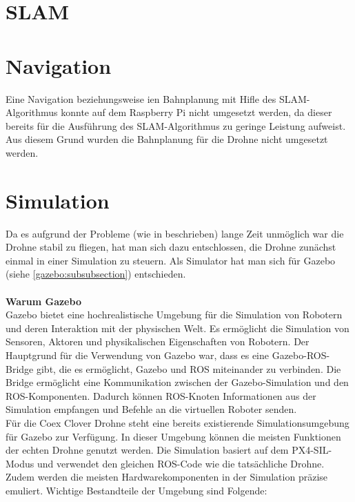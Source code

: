 
\section{SLAM} \label{slam:section}
\section{Navigation} \label{navigation:section} 
Eine Navigation beziehungsweise ien Bahnplanung mit Hifle des \ac{SLAM}-Algorithmus konnte auf dem Raspberry Pi nicht umgesetzt werden, da dieser bereits für die Ausführung des \ac{SLAM}-Algorithmus zu geringe Leistung aufweist. Aus diesem Grund wurden die Bahnplanung für die Drohne nicht umgesetzt werden.



\section{Simulation} \label{simulation:section}
Da es aufgrund der Probleme (wie in  beschrieben) lange Zeit unmöglich war die Drohne stabil zu fliegen, hat man  sich dazu entschlossen, die Drohne zunächst einmal in einer Simulation zu steuern. Als Simulator hat man sich für Gazebo (siehe \ref{gazebo:subsubsection}) entschieden. \\
\\
\textbf{Warum Gazebo} \\
Gazebo bietet eine hochrealistische Umgebung für die Simulation von Robotern und deren Interaktion mit der physischen Welt. Es ermöglicht die Simulation von Sensoren, Aktoren und physikalischen Eigenschaften von Robotern. Der Hauptgrund für die Verwendung von Gazebo war, dass es eine Gazebo-ROS-Bridge gibt, die es ermöglicht, Gazebo und ROS miteinander zu verbinden. Die Bridge ermöglicht eine Kommunikation zwischen der Gazebo-Simulation und den ROS-Komponenten. Dadurch können ROS-Knoten Informationen aus der Simulation empfangen und Befehle an die virtuellen Roboter senden. \\

Für die Coex Clover Drohne steht eine bereits existierende Simulationsumgebung für Gazebo zur Verfügung. In dieser Umgebung können die meisten Funktionen der echten Drohne genutzt werden. Die Simulation basiert auf dem PX4-SIL-Modus und verwendet den gleichen ROS-Code wie die tatsächliche Drohne. Zudem werden die meisten Hardwarekomponenten in der Simulation präzise emuliert. Wichtige Bestandteile der Umgebung sind Folgende:

